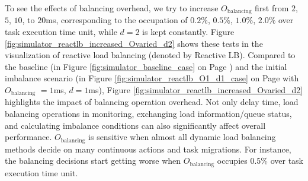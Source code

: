 To see the effects of balancing overhead, we try to increase $O_{\text{balancing}}$ first from $2$, $5$, $10$, to $20$ms, corresponding to the occupation of $0.2\%$, $0.5\%$, $1.0\%$, $2.0\%$ over task execution time unit, while $d = 2$ is kept constantly. Figure \ref{fig:simulator_reactlb_increased_Ovaried_d2} shows these tests in the visualization of reactive load balancing (denoted by Reactive LB). Compared to the baseline (in Figure \ref{fig:simulator_baseline_case} on Page \pageref{fig:simulator_baseline_case}) and the initial imbalance scenario (in Figure \ref{fig:simulator_reactlb_O1_d1_case} on Page \pageref{fig:simulator_reactlb_O1_d1_case} with $O_{\text{balancing}}$ $=1$ms, $d=1$ms), Figure \ref{fig:simulator_reactlb_increased_Ovaried_d2} highlights the impact of balancing operation overhead. Not only delay time, load balancing operations in monitoring, exchanging load information/queue status, and calculating imbalance conditions can also significantly affect overall performance. $O_{\text{balancing}}$ is sensitive when almost all dynamic load balancing methods decide on many continuous actions and task migrations. For instance, the balancing decisions start getting worse when $O_{\text{balancing}}$ occupies $0.5\%$ over task execution time unit.\\

